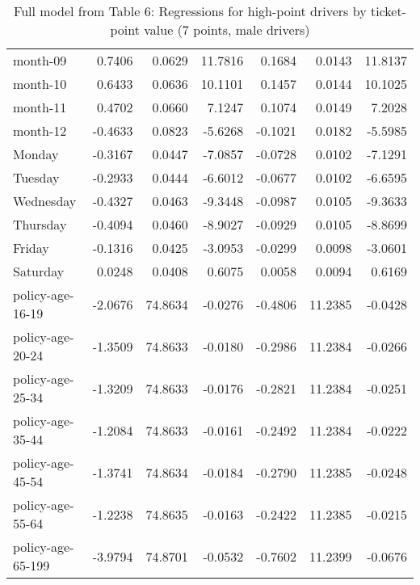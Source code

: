 \documentclass[10pt]{article}
\begin{document}
\begin{table}[ht]
\begin{tabular}{lrrrrrr}
  month-09 & 0.7406 & 0.0629 & 11.7816 & 0.1684 & 0.0143 & 11.8137 \\ 
  month-10 & 0.6433 & 0.0636 & 10.1101 & 0.1457 & 0.0144 & 10.1025 \\ 
  month-11 & 0.4702 & 0.0660 & 7.1247 & 0.1074 & 0.0149 & 7.2028 \\ 
  month-12 & -0.4633 & 0.0823 & -5.6268 & -0.1021 & 0.0182 & -5.5985 \\ 
  Monday & -0.3167 & 0.0447 & -7.0857 & -0.0728 & 0.0102 & -7.1291 \\ 
  Tuesday & -0.2933 & 0.0444 & -6.6012 & -0.0677 & 0.0102 & -6.6595 \\ 
  Wednesday & -0.4327 & 0.0463 & -9.3448 & -0.0987 & 0.0105 & -9.3633 \\ 
  Thursday & -0.4094 & 0.0460 & -8.9027 & -0.0929 & 0.0105 & -8.8699 \\ 
  Friday & -0.1316 & 0.0425 & -3.0953 & -0.0299 & 0.0098 & -3.0601 \\ 
  Saturday & 0.0248 & 0.0408 & 0.6075 & 0.0058 & 0.0094 & 0.6169 \\ 
  policy-age-16-19 & -2.0676 & 74.8634 & -0.0276 & -0.4806 & 11.2385 & -0.0428 \\ 
  policy-age-20-24 & -1.3509 & 74.8633 & -0.0180 & -0.2986 & 11.2384 & -0.0266 \\ 
  policy-age-25-34 & -1.3209 & 74.8633 & -0.0176 & -0.2821 & 11.2384 & -0.0251 \\ 
  policy-age-35-44 & -1.2084 & 74.8633 & -0.0161 & -0.2492 & 11.2384 & -0.0222 \\ 
  policy-age-45-54 & -1.3741 & 74.8634 & -0.0184 & -0.2790 & 11.2385 & -0.0248 \\ 
  policy-age-55-64 & -1.2238 & 74.8635 & -0.0163 & -0.2422 & 11.2385 & -0.0215 \\ 
  policy-age-65-199 & -3.9794 & 74.8701 & -0.0532 & -0.7602 & 11.2399 & -0.0676 \\ 
   \hline
\end{tabular}
\caption{Full model from Table 6: Regressions for high-point drivers by ticket-point value (7 points, male drivers)} 
\label{tab_6_7_pts_M}
\end{table}


\clearpage
\pagebreak



\end{document}
